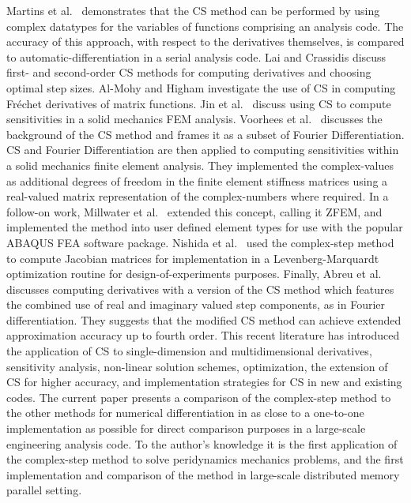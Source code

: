 \documentclass[preprint,12pt]{elsarticle}
\begin{document}
Martins et al.\ \cite{martins2003complex} demonstrates that the CS method can be performed by using complex datatypes for the variables of functions comprising an analysis code. The accuracy of this approach, with respect to the derivatives themselves, is compared to automatic-differentiation in a serial analysis code. Lai and Crassidis \cite{lai2008extensions} discuss first- and second-order CS methods for computing derivatives and choosing optimal step sizes.  Al-Mohy and Higham \cite{al2010complex} investigate the use of CS in computing Fr\'{e}chet derivatives of matrix functions. Jin et al.\ \cite{jin2010improved} discuss using CS to compute sensitivities in a solid mechanics FEM analysis.  Voorhees et al.\ \cite{voorhees2011complex} discusses the background of the CS method and frames it as a subset of Fourier Differentiation. CS and Fourier Differentiation are then applied to computing sensitivities within a solid mechanics finite element analysis. They implemented the complex-values as additional degrees of freedom in the finite element stiffness matrices using a real-valued matrix representation of the complex-numbers where required. In a follow-on work,  Millwater et al.\  \cite{millwater2013application} extended this concept, calling it ZFEM, and implemented the method into user defined element types for use with the popular ABAQUS \cite{systemes2012abaqus} FEA software package.  Nishida et al.\ \cite{nishida2013} used the complex-step method to compute Jacobian matrices for implementation in a Levenberg-Marquardt optimization routine for design-of-experiments purposes.  Finally, Abreu et al.\ \cite{abreu2013generalization} discusses computing derivatives with a version of the CS method which features the combined use of real and imaginary valued step components, as in Fourier differentiation.  They suggests that the modified CS method can achieve extended approximation accuracy up to fourth order.  This recent literature has introduced the application of CS to single-dimension and multidimensional derivatives, sensitivity analysis, non-linear solution schemes, optimization, the extension of CS for higher accuracy, and implementation strategies for CS in new and existing codes.  The current paper presents a comparison of the complex-step method to the other methods for numerical differentiation in as close to a one-to-one implementation as possible for direct comparison purposes in a large-scale engineering analysis code. To the author's knowledge it is the first application of the complex-step method to solve peridynamics mechanics problems, and the first implementation and comparison of the method in large-scale distributed memory parallel setting. 
\end{document}
